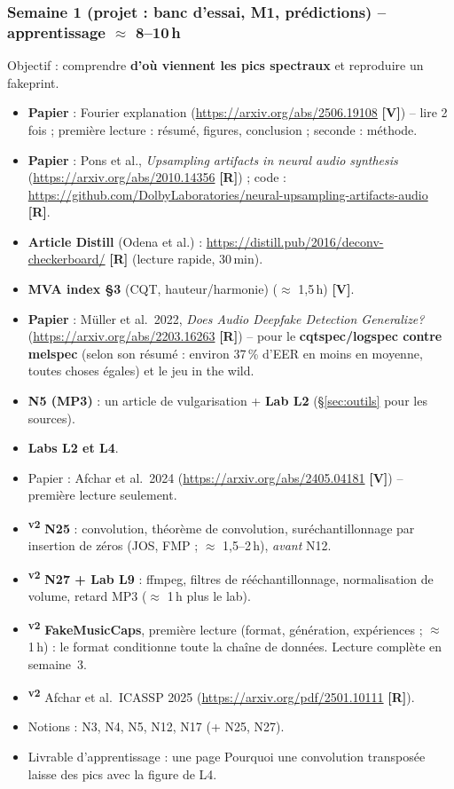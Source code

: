 \documentclass[11pt,a4paper]{article}
\providecommand{\og}{\guillemotleft\nobreakspace}%
\providecommand{\fg}{\nobreakspace\guillemotright}}
\newcommand{\sS}{\ding{72}}   %
\newcommand{\sO}{\ding{73}}   %
\newcommand{\vtwo}{\textsuperscript{\textcolor{orange!80!black}{\textbf{v2}}}}
\newcommand{\lV}{\textbf{\textcolor{green!45!black}{[V]}}}
\newcommand{\lR}{\textbf{\textcolor{orange!80!black}{[R]}}}
\begin{document}
\subsubsection{Semaine 1 (projet : banc d'essai, M1, prédictions) -- apprentissage $\approx$ 8--10\,h}
Objectif : comprendre \textbf{d'où viennent les pics spectraux} et reproduire un fakeprint.
\begin{itemize}
\item \textbf{\sS} \textbf{Papier} : Fourier explanation (\url{https://arxiv.org/abs/2506.19108} \lV) -- lire 2 fois ; première lecture : résumé, figures, conclusion ; seconde : méthode.
\item \textbf{\sS} \textbf{Papier} : Pons et al., \emph{Upsampling artifacts in neural audio synthesis} (\url{https://arxiv.org/abs/2010.14356} \lR) ; code : \url{https://github.com/DolbyLaboratories/neural-upsampling-artifacts-audio} \lR.
\item \textbf{\sS} \textbf{Article Distill} (Odena et al.) : \url{https://distill.pub/2016/deconv-checkerboard/} \lR{} (lecture rapide, 30\,min).
\item \textbf{\sS} \textbf{MVA index §3} (CQT, hauteur/harmonie) ($\approx$ 1,5\,h) \lV.
\item \textbf{\sS} \textbf{Papier} : Müller et al.\ 2022, \emph{Does Audio Deepfake Detection Generalize?} (\url{https://arxiv.org/abs/2203.16263} \lR) -- pour le \textbf{cqtspec/logspec contre melspec} (selon son résumé : environ 37\,\% d'EER en moins en moyenne, toutes choses égales) et le jeu \og{}in the wild\fg{}.
\item \textbf{\sS} \textbf{N5 (MP3)} : un article de vulgarisation + \textbf{Lab L2} (§\ref{sec:outils} pour les sources).
\item \textbf{\sS} \textbf{Labs L2 et L4}.
\item \textbf{\sO} Papier : Afchar et al.\ 2024 (\url{https://arxiv.org/abs/2405.04181} \lV) -- première lecture seulement.
\item \vtwo{} \textbf{\sS} \textbf{N25} : convolution, théorème de convolution, suréchantillonnage par insertion de zéros (JOS, FMP ; $\approx$ 1,5--2\,h), \emph{avant} N12.
\item \vtwo{} \textbf{\sS} \textbf{N27 + Lab L9} : ffmpeg, filtres de rééchantillonnage, normalisation de volume, retard MP3 ($\approx$ 1\,h plus le lab).
\item \vtwo{} \textbf{\sS} \textbf{FakeMusicCaps}, première lecture (format, génération, expériences ; $\approx$ 1\,h) : le format conditionne toute la chaîne de données. Lecture complète en semaine~3.
\item \vtwo{} \textbf{\sO} Afchar et al.\ ICASSP 2025 (\url{https://arxiv.org/pdf/2501.10111} \lR).
\item Notions : N3, N4, N5, N12, N17 (+ N25, N27).
\item Livrable d'apprentissage : une page \og{}Pourquoi une convolution transposée laisse des pics\fg{} avec la figure de L4.
\end{itemize}
\end{document}
